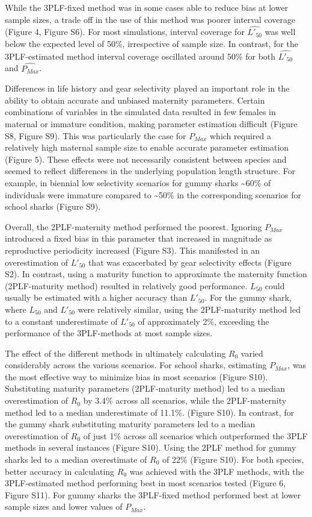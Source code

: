 \documentclass[
]{article}
\begin{document}
While the 3PLF-fixed method was in some cases able to reduce bias at lower sample sizes, a trade off in the use of this method was poorer interval coverage (Figure 4, Figure S6). For most simulations, interval coverage for \(\hat{L'_{50}}\) was well below the expected level of 50\%, irrespective of sample size. In contrast, for the 3PLF-estimated method interval coverage oscillated around 50\% for both \(\hat{L'_{50}}\) and \(\hat{P_{Max}}\).

Differences in life history and gear selectivity played an important role in the ability to obtain accurate and unbiased maternity parameters. Certain combinations of variables in the simulated data resulted in few females in maternal or immature condition, making parameter estimation difficult (Figure S8, Figure S9). This was particularly the case for \(P_{Max}\) which required a relatively high maternal sample size to enable accurate parameter estimation (Figure 5). These effects were not necessarily consistent between species and seemed to reflect differences in the underlying population length structure. For example, in biennial low selectivity scenarios for gummy sharks \textasciitilde60\% of individuals were immature compared to \textasciitilde50\% in the corresponding scenarios for school sharks (Figure S9).

Overall, the 2PLF-maternity method performed the poorest. Ignoring \(P_{Max}\) introduced a fixed bias in this parameter that increased in magnitude as reproductive periodicity increased (Figure S3). This manifested in an overestimation of \(L'_{50}\) that was exacerbated by gear selectivity effects (Figure S2). In contrast, using a maturity function to approximate the maternity function (2PLF-maturity method) resulted in relatively good performance. \(L_{50}\) could usually be estimated with a higher accuracy than \(L'_{50}\). For the gummy shark, where \(L_{50}\) and \(L'_{50}\) were relatively similar, using the 2PLF-maturity method led to a constant underestimate of \(L'_{50}\) of approximately 2\%, exceeding the performance of the 3PLF-methods at most sample sizes.

The effect of the different methods in ultimately calculating \(R_0\) varied considerably across the various scenarios. For school sharks, estimating \(P_{Max}\), was the most effective way to minimize bias in most scenarios (Figure S10). Substituting maturity parameters (2PLF-maturity method) led to a median overestimation of \(R_0\) by 3.4\% across all scenarios, while the 2PLF-maternity method led to a median underestimate of 11.1\%. (Figure S10). In contrast, for the gummy shark substituting maturity parameters led to a median overestimation of \(R_0\) of just 1\% across all scenarios which outperformed the 3PLF methods in several instances (Figure S10). Using the 2PLF method for gummy sharks led to a median overestimate of \(R_0\) of 22\% (Figure S10). For both species, better accuracy in calculating \(R_0\) was achieved with the 3PLF methods, with the 3PLF-estimated method performing best in most scenarios tested (Figure 6, Figure S11). For gummy sharks the 3PLF-fixed method performed best at lower sample sizes and lower values of \(P_{Max}\).
\end{document}
